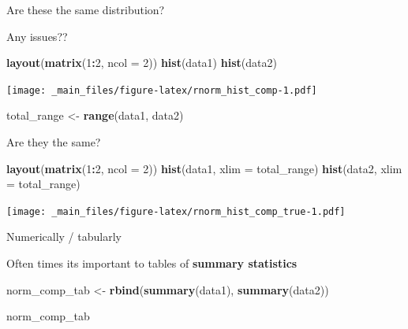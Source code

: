 \documentclass[
]{book}
\newenvironment{Shaded}{\begin{snugshade}}{\end{snugshade}}
\newcommand{\AttributeTok}[1]{\textcolor[rgb]{0.13,0.29,0.53}{#1}}
\newcommand{\DecValTok}[1]{\textcolor[rgb]{0.00,0.00,0.81}{#1}}
\newcommand{\FunctionTok}[1]{\textcolor[rgb]{0.13,0.29,0.53}{\textbf{#1}}}
\newcommand{\NormalTok}[1]{#1}
\newcommand{\OtherTok}[1]{\textcolor[rgb]{0.56,0.35,0.01}{#1}}
\newcommand{\SpecialCharTok}[1]{\textcolor[rgb]{0.81,0.36,0.00}{\textbf{#1}}}
\begin{document}
Are these the same distribution?

Any issues??

\begin{Shaded}
\begin{Highlighting}[]
\FunctionTok{layout}\NormalTok{(}\FunctionTok{matrix}\NormalTok{(}\DecValTok{1}\SpecialCharTok{:}\DecValTok{2}\NormalTok{, }\AttributeTok{ncol =} \DecValTok{2}\NormalTok{))}
\FunctionTok{hist}\NormalTok{(data1)}
\FunctionTok{hist}\NormalTok{(data2)}
\end{Highlighting}
\end{Shaded}

\texttt{[image: \_main\_files/figure-latex/rnorm\_hist\_comp-1.pdf]}

\begin{Shaded}
\begin{Highlighting}[]
\NormalTok{total\_range }\OtherTok{\textless{}{-}} \FunctionTok{range}\NormalTok{(data1, data2)}
\end{Highlighting}
\end{Shaded}

Are they the same?

\begin{Shaded}
\begin{Highlighting}[]
\FunctionTok{layout}\NormalTok{(}\FunctionTok{matrix}\NormalTok{(}\DecValTok{1}\SpecialCharTok{:}\DecValTok{2}\NormalTok{, }\AttributeTok{ncol =} \DecValTok{2}\NormalTok{))}
\FunctionTok{hist}\NormalTok{(data1, }\AttributeTok{xlim =}\NormalTok{ total\_range)}
\FunctionTok{hist}\NormalTok{(data2, }\AttributeTok{xlim =}\NormalTok{ total\_range)}
\end{Highlighting}
\end{Shaded}

\texttt{[image: \_main\_files/figure-latex/rnorm\_hist\_comp\_true-1.pdf]}

Numerically / tabularly

Often times its important to tables of \textbf{summary statistics}

\begin{Shaded}
\begin{Highlighting}[]
\NormalTok{norm\_comp\_tab }\OtherTok{\textless{}{-}} \FunctionTok{rbind}\NormalTok{(}\FunctionTok{summary}\NormalTok{(data1),}
                       \FunctionTok{summary}\NormalTok{(data2))}

\NormalTok{norm\_comp\_tab}
\end{Highlighting}
\end{Shaded}
\end{document}
